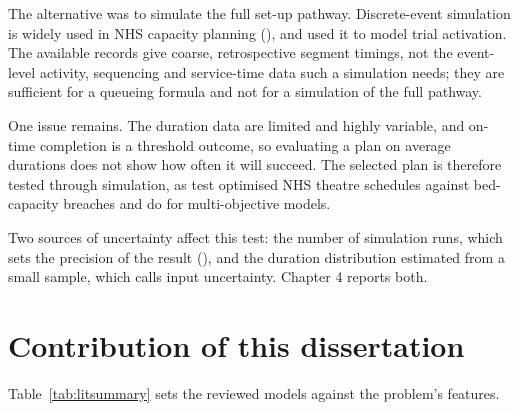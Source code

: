 The alternative was to simulate the full set-up pathway. Discrete-event simulation is widely used in NHS capacity planning (\citealp{Demir2017DemandCapacity,Harper2023Orthopaedic}), and \citet{Martinez2016TrialActivation} used it to model trial activation. The available records give coarse, retrospective segment timings, not the event-level activity, sequencing and service-time data such a simulation needs; they are sufficient for a queueing formula and not for a simulation of the full pathway.

One issue remains. The duration data are limited and highly variable, and on-time completion is a threshold outcome, so evaluating a plan on average durations does not show how often it will succeed. The selected plan is therefore tested through simulation, as \citet{Kheiri2021Theatre} test optimised NHS theatre schedules against bed-capacity breaches and \citet{Mavrotas2015Robustness} do for multi-objective models.

Two sources of uncertainty affect this test: the number of simulation runs, which sets the precision of the result (\citealp{Morris2019SimulationStudies}), and the duration distribution estimated from a small sample, which \citet{Barton2012InputUncertainty} calls input uncertainty. Chapter 4 reports both.

\section{Contribution of this dissertation}
\label{sec:contribution}

Table~\ref{tab:litsummary} sets the reviewed models against the problem's features.

